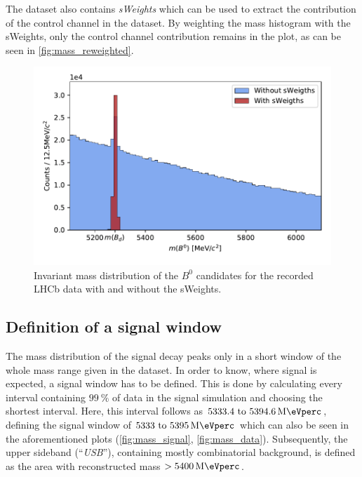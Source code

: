 The dataset also contains \textit{sWeights} which can be used to extract the contribution of the control channel in the dataset.
By weighting the mass histogram with the sWeights, only the control channel contribution remains in the plot, as can be seen in \autoref{fig:mass_reweighted}.
\begin{figure}
  \centering
  \includegraphics[width = .8\textwidth]{"content/plots/mass_reweighted.pdf"}
  \caption{Invariant mass distribution of the $B^0$ candidates for the recorded LHCb data with and without the sWeights.}
  \label{fig:mass_reweighted}
\end{figure}

\subsection{Definition of a signal window}
The mass distribution of the signal decay peaks only in a short window of the whole mass range given in the dataset. In order to know, where signal is expected, a signal window 
has to be defined. This is done by calculating every interval containing $\qty{99}{\percent}$ of data in the signal simulation and choosing the shortest interval. 
Here, this interval follows as $\qtyrange[range-units = single]{5333.4}{5394.6}{\mega\eVperc}$, defining the signal window of 
$\qtyrange[range-units = single]{5333}{5395}{\mega\eVperc}$ which can also be seen in the aforementioned plots (\ref{fig:mass_signal}, \ref{fig:mass_data}).
Subsequently, the upper sideband (\enquote{\textit{USB}}), containing mostly combinatorial background, is defined as the area with reconstructed mass $> \qty{5400}{\mega\eVperc}$.

